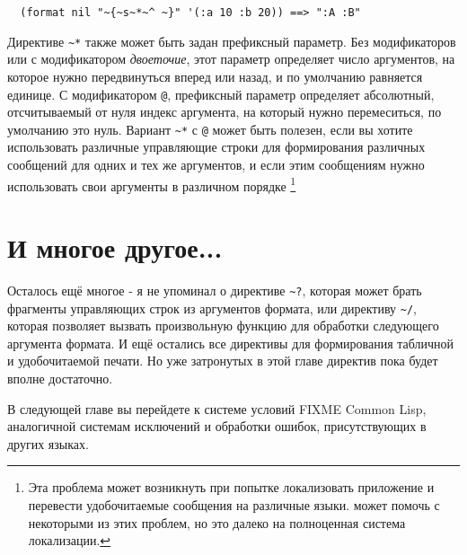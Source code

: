 \begin{verbatim}
  (format nil "~{~s~*~^ ~}" '(:a 10 :b 20)) ==> ":A :B"
\end{verbatim}

Директиве \lstinline!~*! также может быть задан префиксный параметр. Без модификаторов или
с модификатором \textit{двоеточие}, этот параметр определяет число аргументов, на которое
нужно передвинуться вперед или назад, и по умолчанию равняется единице. С модификатором
\lstinline!@!, префиксный параметр определяет абсолютный, отсчитываемый от нуля индекс
аргумента, на который нужно перемеситься, по умолчанию это нуль. Вариант \lstinline!~*! с
\lstinline!@! может быть полезен, если вы хотите использовать различные управляющие строки
для формирования различных сообщений для одних и тех же аргументов, и если этим сообщениям
нужно использовать свои аргументы в различном порядке \footnote{Эта проблема может
  возникнуть при попытке локализовать приложение и перевести удобочитаемые сообщения на
  различные языки.  может помочь с некоторыми из этих проблем, но это далеко
  на полноценная система локализации.}

\section{И многое другое...}

Осталось ещё многое - я не упоминал о директиве \lstinline!~?!, которая может брать
фрагменты управляющих строк из аргументов формата, или директиву \lstinline!~/!, которая
позволяет вызвать произвольную функцию для обработки следующего аргумента формата. И ещё
остались все директивы для формирования табличной и удобочитаемой печати. Но уже
затронутых в этой главе директив пока будет вполне достаточно.

В следующей главе вы перейдете к системе условий FIXME Common Lisp, аналогичной системам
исключений и обработки ошибок, присутствующих в других языках.



